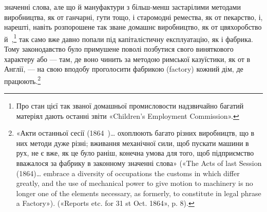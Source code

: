 \parcont{}  %
значенні слова, але що й мануфактури з більш-менш застарілими
методами виробництва, як от ганчарні, гути тощо, і старомодні
ремества, як от пекарство, і, нарешті, навіть розпорошене
так зване домашнє виробництво, як от цвяхоробство й~,\footnote{
Про стан цієї так званої домашньої промисловости надзвичайно
багатий матеріял дають останні звіти «Children’s Employment Commission».
}
так само вже давно попали під капіталістичну експлуатацію,
як і фабрика. Тому законодавство було примушене поволі
позбутися свого виняткового характеру або — там, де воно чинить
за методою римської казуїстики, як от в Англії, — на свою вподобу
проголосити фабрикою (factory) кожний дім, де працюють.\footnote{
«Акти останньої сесії (1864~)\dots{} охоплюють багато різних виробництв,
що в них методи дуже різні; вживання механічної сили, щоб пускати
машини в рух, не є вже, як це було раніш, конечна умова для того, щоб
підприємство вважалося за фабрику в законному значенні слова» («The
Acts of last Session (1864)\dots{} embrace a diversity of occupations the customs
in which differ greatly, and the use of mechanical power to give motion to
machinery is no longer one of the elements necessary, as formerly, to constitute
in legal phrase a Factory»). («Reports etc. for 31 st Oct. 1864», p. 8).
}

